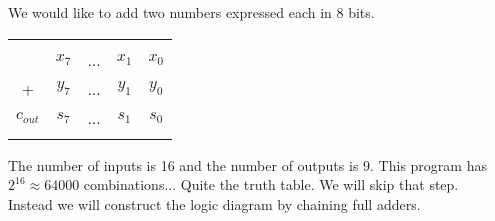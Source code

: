 \documentclass[]{article}
\begin{document}
We would like to add two numbers expressed each in 8 bits.\\

\begin{center}
	\begin{tabular}{ccccc}
		& \tiny & \tiny & \tiny & \tiny \\
		& $x_{7}$ & ... & $x_{1}$ & $x_{0}$ \\
		+ & $y_{7}$ & ... & $y_{1}$ & $y_{0}$ \\
		\hline
		$c_{out}$ & $s_{7}$ & ... & $s_{1}$ & $s_{0}$ \\\smallskip
	\end{tabular}
\end{center}\bigbreak

The number of inputs is 16 and the number of outputs is 9. This program has $2^16 \approx 64000$ combinations... Quite the truth table. We will skip that step.\\

Instead we will construct the logic diagram by chaining full adders.\\
\end{document}
